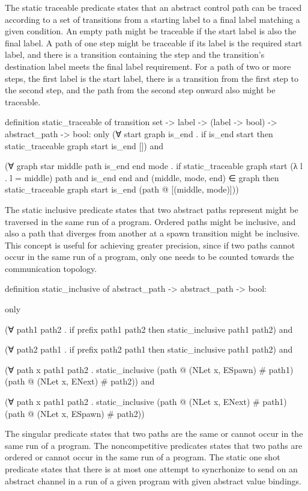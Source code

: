 The static traceable predicate states that an abstract control path can be traced according to
a set of transitions from a starting label to a final label matching a given condition.  An
empty path might be traceable if the start label is also the final label.  A path of one step
might be traceable if its label is the required start label, and there is a transition
containing the step and the transition's destination label meets the final label requirement.
For a path of two or more steps, the first label is the start label, there is a transition from
the first step to the second step, and the path from the second step onward also might be
traceable.


definition static_traceable of transition set -> label -> (label -> bool) -> abstract_path -> bool:
only
(∀ start graph is_end .
  if
    is_end start
  then
    static_traceable graph start is_end []) and

(∀  graph star middle path is_end end mode .
  if 
    static_traceable graph start (λ l . l = middle) path and
    is_end end and
    (middle, mode, end) ∈ graph 
  then
    static_traceable graph start is_end (path @ [(middle, mode)]))


The static inclusive predicate states that two abstract paths represent might be traversed in
the same run of a program. Ordered paths might be inclusive, and also a path that diverges
from another at a spawn transition might be inclusive.  This concept is useful for achieving
greater precision, since if two paths cannot occur in the same run of a program, only one needs
to be counted towards the communication topology. 

definition static_inclusive of abstract_path -> abstract_path -> bool:

only

(∀ path1 path2 .
  if
    prefix path1 path2
  then
    static_inclusive path1 path2) and

(∀ path2 path1 .
  if
    prefix path2 path1
  then
    static_inclusive path1 path2) and

(∀ path x path1 path2 .
    static_inclusive (path @ (NLet x, ESpawn) # path1) (path @ (NLet x, ENext) # path2)) and

(∀ path x path1 path2 .
    static_inclusive (path @ (NLet x, ENext) # path1) (path @ (NLet x, ESpawn) # path2))


The singular predicate states that two paths are the same or cannot occur in the same run of a
program. The noncompetitive predicates states that two paths are ordered or cannot occur in the
same run of a program. The static one shot predicate states that there is at most one attempt
to syncrhonize to send on an abstract channel in a run of a given program with given abstract
value bindings.

